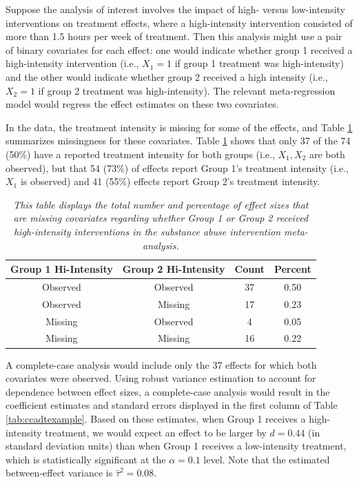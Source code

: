 \documentclass[
]{article}
\begin{document}
Suppose the analysis of interest involves the impact of high- versus low-intensity interventions on treatment effects, where a high-intensity intervention consisted of more than 1.5 hours per week of treatment.
Then this analysis might use a pair of binary covariates for each effect: one would indicate whether group 1 received a high-intensity intervention (i.e., \(X_1 = 1\) if group 1 treatment was high-intensity) and the other would indicate whether group 2 received a high intensity (i.e., \(X_{2} = 1\) if group 2 treatment was high-intensity).
The relevant meta-regression model would regress the effect estimates on these two covariates.

In the data, the treatment intensity is missing for some of the effects, and Table \ref{tab:misspat} summarizes missingness for these covariates.
Table \ref{tab:misspat} shows that only 37 of the 74 (50\%) have a reported treatment intensity for both groups (i.e., \(X_{1}, X_{2}\) are both observed), but that 54 (73\%) of effects report Group 1's treatment intensity (i.e., \(X_{1}\) is observed) and 41 (55\%) effects report Group 2's treatment intensity.

\begin{table}

\caption{\label{tab:unnamed-chunk-2}\label{tab:misspat} \textit{This table displays the total number and percentage of effect sizes that are missing covariates regarding whether Group 1 or Group 2 received high-intensity interventions in the substance abuse intervention meta-analysis.}}
\centering
\begin{tabular}[t]{cccc}
\toprule
Group 1 Hi-Intensity & Group 2 Hi-Intensity & Count & Percent\\
\midrule
Observed & Observed & 37 & 0.50\\
Observed & Missing & 17 & 0.23\\
Missing & Observed & 4 & 0.05\\
Missing & Missing & 16 & 0.22\\
\bottomrule
\end{tabular}
\end{table}

A complete-case analysis would include only the 37 effects for which both covariates were observed.
Using robust variance estimation to account for dependence between effect sizes, a complete-case analysis would result in the coefficient estimates and standard errors displayed in the first column of Table \ref{tab:ccadtexample}.
Based on these estimates, when Group 1 receives a high-intensity treatment, we would expect an effect to be larger by \(d = 0.44\) (in standard deviation units) than when Group 1 receives a low-intensity treatment, which is statistically significant at the \(\alpha = 0.1\) level.
Note that the estimated between-effect variance is \(\hat{\tau}^2 = 0.08\).
\end{document}

